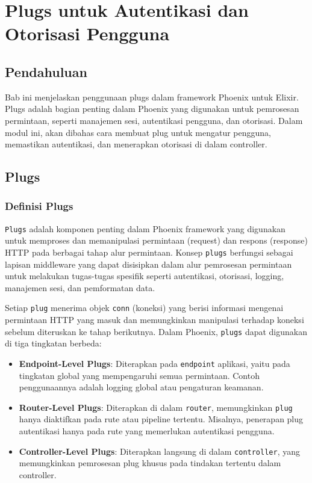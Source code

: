 \chapter{Plugs untuk Autentikasi dan Otorisasi Pengguna}

\section{Pendahuluan}
Bab ini menjelaskan penggunaan plugs dalam framework Phoenix untuk Elixir. Plugs adalah bagian penting dalam Phoenix yang digunakan untuk pemrosesan permintaan, seperti manajemen sesi, autentikasi pengguna, dan otorisasi. Dalam modul ini, akan dibahas cara membuat plug untuk mengatur pengguna, memastikan autentikasi, dan menerapkan otorisasi di dalam controller.

\section{Plugs}

\subsection{Definisi Plugs}
\texttt{Plugs} adalah komponen penting dalam Phoenix framework yang digunakan untuk memproses dan memanipulasi permintaan (request) dan respons (response) HTTP pada berbagai tahap alur permintaan. Konsep \texttt{plugs} berfungsi sebagai lapisan middleware yang dapat disisipkan dalam alur pemrosesan permintaan untuk melakukan tugas-tugas spesifik seperti autentikasi, otorisasi, logging, manajemen sesi, dan pemformatan data.

Setiap \texttt{plug} menerima objek \texttt{conn} (koneksi) yang berisi informasi mengenai permintaan HTTP yang masuk dan memungkinkan manipulasi terhadap koneksi sebelum diteruskan ke tahap berikutnya. Dalam Phoenix, \texttt{plugs} dapat digunakan di tiga tingkatan berbeda:
\begin{itemize}
	\item \textbf{Endpoint-Level Plugs}: Diterapkan pada \texttt{endpoint} aplikasi, yaitu pada tingkatan global yang mempengaruhi semua permintaan. Contoh penggunaannya adalah logging global atau pengaturan keamanan.
	\item \textbf{Router-Level Plugs}: Diterapkan di dalam \texttt{router}, memungkinkan \texttt{plug} hanya diaktifkan pada rute atau pipeline tertentu. Misalnya, penerapan plug autentikasi hanya pada rute yang memerlukan autentikasi pengguna.
	\item \textbf{Controller-Level Plugs}: Diterapkan langsung di dalam \texttt{controller}, yang memungkinkan pemrosesan plug khusus pada tindakan tertentu dalam controller.
\end{itemize}

